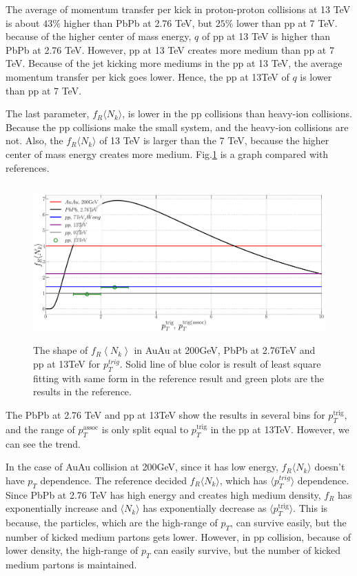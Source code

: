 \documentclass[jkps,fleqn,showpacs,showkeys]{revtex4}
\begin{document}
The average of momentum transfer per kick in proton-proton collisions at 13 TeV is about $43\%$ higher than PbPb at 2.76 TeV, but $25\%$ lower than pp at 7 TeV.
because of the higher center of mass energy, $q$ of pp at 13 TeV is higher than PbPb at 2.76 TeV.
However, pp at 13 TeV creates more medium than pp at 7 TeV.
Because of the jet kicking more mediums in the pp at 13 TeV, the average momentum transfer per kick goes lower.
Hence, the pp at 13TeV of $q$ is lower than pp at 7 TeV.

The last parameter, $f_R \langle N_k \rangle$, is lower in the pp collisions than heavy-ion collisions.
Because the pp collisions make the small system, and the heavy-ion collisions are not.
Also, the $f_R \langle N_k \rangle$ of 13 TeV is larger than the 7 TeV, because the higher center of mass energy creates more medium.
Fig.\ref{figure:frnk} is a graph compared with references\cite{Wong_1, PbPb, Hanul}.


\begin{figure}[ht]
\centering
\includegraphics[width=12cm, height=6cm]{./Figures/Paper_frnk}
\caption{The shape of $f_R \left\langle N_k \right\rangle$ in AuAu at 200GeV, PbPb at 2.76TeV and pp at 13TeV for $p_{T}^{trig}$.
Solid line of blue color is result of least square fitting with same form in the reference\cite{PbPb} result and green plots are the results in the reference\cite{Hanul}.}
\label{figure:frnk}
\end{figure}

The PbPb at 2.76 TeV and pp at 13TeV show the results in several bins for $p_T^{\text{trig}}$, and the range of $p_T^{\text{assoc}}$ is only split equal to $p_T^{\text{trig}}$ in the pp at 13TeV. However, we can see the trend.

In the case of AuAu collision at 200GeV, since it has low energy, $f_R \langle N_k \rangle$ doesn't have $p_T$ dependence.
The reference\cite{PbPb} decided  $f_R \langle N_k \rangle$, which has $\langle p_T^{trig} \rangle$ dependence. Since PbPb at 2.76 TeV has high energy and creates high medium density, $f_R$ has exponentially increase and $\langle N_k \rangle$ has exponentially decrease as $\langle p_T^{\text{trig}} \rangle$. This is because, the particles, which are the high-range of $p_T$, can survive easily, but the number of kicked medium partons gets lower.
However, in pp collision, because of lower density, the high-range of $p_T$ can easily survive, but the number of kicked medium partons is maintained.
\end{document}
